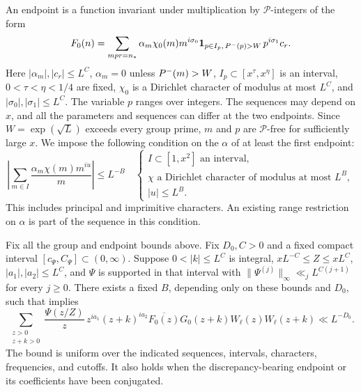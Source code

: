 An endpoint is a function invariant under multiplication by
$\mathcal P$-integers of the form
\begin{equation}\label{eq:endpoint-form}
 F_0(n)=\sum_{mpr=n_*}
   \alpha_m\chi_0(m)m^{i\sigma_0}
   \mathbf 1_{p\in I_p,\,P^{-}(p)>W}\,p^{i\sigma_1}c_r.
\end{equation}
Here $|\alpha_m|,|c_r|\leq L^C$, $\alpha_m=0$ unless
$P^{-}(m)>W$, $I_p\subset[x^\tau,x^\eta]$ is an interval,
$0<\tau<\eta<1/4$ are fixed, $\chi_0$ is a Dirichlet character of
modulus at most $L^C$, and $|\sigma_0|,|\sigma_1|\leq L^C$.
The variable $p$ ranges over integers. The sequences may depend on $x$,
and all the parameters and sequences can differ at the two endpoints.
Since $W=\exp(\sqrt L)$ exceeds every
group prime, $m$ and $p$ are $\mathcal P$-free for sufficiently large $x$.
We impose the following condition on the $\alpha$ of at least the first
endpoint:
\begin{equation}\label{eq:discrepancy}
 \left|\sum_{m\in I}\frac{\alpha_m\chi(m)m^{iu}}m\right|
       \leq L^{-B}
 \quad\left\{
 \begin{array}{l}
 I\subset[1,x^2]\text{ an interval},\\
 \chi\text{ a Dirichlet character of modulus at most }L^B,\\
 |u|\leq L^B.
 \end{array}\right.
\end{equation}
This includes principal and imprimitive characters. An existing range
restriction on $\alpha$ is part of the sequence in this condition.

\begin{theorem}\label{thm:shift}
Fix all the group and endpoint bounds above. Fix $D_0,C>0$ and a fixed
compact interval $[c_\Psi,C_\Psi]\subset(0,\infty)$. Suppose
$0<|k|\leq L^C$ is integral, $xL^{-C}\leq Z\leq xL^C$,
$|a_1|,|a_2|\leq L^C$, and $\Psi$ is supported in that interval with
$\|\Psi^{(j)}\|_\infty\ll_j L^{C(j+1)}$ for every $j\geq0$.
There exists a fixed $B$, depending only on these bounds and $D_0$,
such that  implies
\begin{equation}\label{eq:shift-bound}
 \sum_{\substack{z>0\\z+k>0}}
 \frac{\Psi(z/Z)}z\,z^{ia_1}(z+k)^{ia_2}
       \overline{F_0(z)}G_0(z+k)W_\ell(z)W_\ell(z+k)
       \ll L^{-D_0}.
\end{equation}
The bound is uniform over the indicated sequences, intervals, characters,
frequencies, and cutoffs. It also holds when the discrepancy-bearing
endpoint or its coefficients have been conjugated.
\end{theorem}

